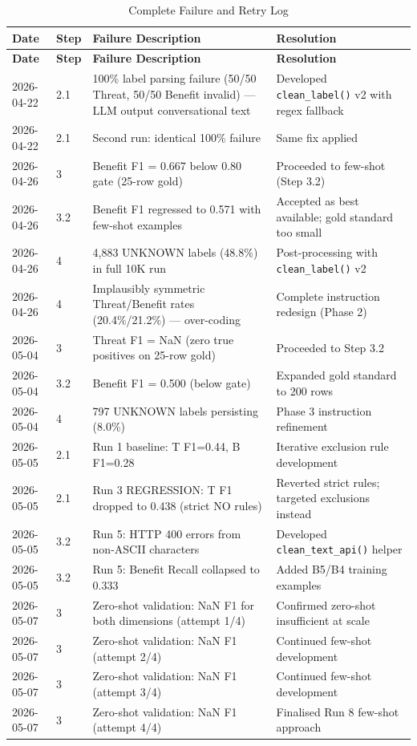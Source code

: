 \begin{longtable}{@{}llp{5cm}p{4cm}@{}}
\caption{Complete Failure and Retry Log} \\
\toprule
\textbf{Date} & \textbf{Step} & \textbf{Failure Description} & \textbf{Resolution} \\
\midrule
\endfirsthead
\toprule
\textbf{Date} & \textbf{Step} & \textbf{Failure Description} & \textbf{Resolution} \\
\midrule
\endhead
2026-04-22 & 2.1 & 100\% label parsing failure (50/50 Threat, 50/50 Benefit invalid) --- LLM output conversational text & Developed \texttt{clean\_label()} v2 with regex fallback \\
\midrule
2026-04-22 & 2.1 & Second run: identical 100\% failure & Same fix applied \\
\midrule
2026-04-26 & 3 & Benefit F1 = 0.667 below 0.80 gate (25-row gold) & Proceeded to few-shot (Step 3.2) \\
\midrule
2026-04-26 & 3.2 & Benefit F1 regressed to 0.571 with few-shot examples & Accepted as best available; gold standard too small \\
\midrule
2026-04-26 & 4 & 4,883 UNKNOWN labels (48.8\%) in full 10K run & Post-processing with \texttt{clean\_label()} v2 \\
\midrule
2026-04-26 & 4 & Implausibly symmetric Threat/Benefit rates (20.4\%/21.2\%) --- over-coding & Complete instruction redesign (Phase 2) \\
\midrule
2026-05-04 & 3 & Threat F1 = NaN (zero true positives on 25-row gold) & Proceeded to Step 3.2 \\
\midrule
2026-05-04 & 3.2 & Benefit F1 = 0.500 (below gate) & Expanded gold standard to 200 rows \\
\midrule
2026-05-04 & 4 & 797 UNKNOWN labels persisting (8.0\%) & Phase 3 instruction refinement \\
\midrule
2026-05-05 & 2.1 & Run 1 baseline: T F1=0.44, B F1=0.28 & Iterative exclusion rule development \\
\midrule
2026-05-05 & 2.1 & Run 3 REGRESSION: T F1 dropped to 0.438 (strict NO rules) & Reverted strict rules; targeted exclusions instead \\
\midrule
2026-05-05 & 3.2 & Run 5: HTTP 400 errors from non-ASCII characters & Developed \texttt{clean\_text\_api()} helper \\
\midrule
2026-05-05 & 3.2 & Run 5: Benefit Recall collapsed to 0.333 & Added B5/B4 training examples \\
\midrule
2026-05-07 & 3 & Zero-shot validation: NaN F1 for both dimensions (attempt 1/4) & Confirmed zero-shot insufficient at scale \\
\midrule
2026-05-07 & 3 & Zero-shot validation: NaN F1 (attempt 2/4) & Continued few-shot development \\
\midrule
2026-05-07 & 3 & Zero-shot validation: NaN F1 (attempt 3/4) & Continued few-shot development \\
\midrule
2026-05-07 & 3 & Zero-shot validation: NaN F1 (attempt 4/4) & Finalised Run 8 few-shot approach \\
\bottomrule
\end{longtable}

